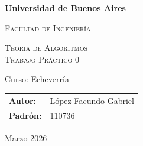 \begin{titlepage}
	\centering
	{\bfseries\LARGE Universidad de Buenos Aires \par}
	\vspace{1cm}
	{\scshape\Large Facultad de Ingeniería \par}
	\vspace{3cm}
	{\scshape\Huge Teoría de Algoritmos \\Trabajo Práctico 0\par}
	\vspace{3cm}
	{\Large Curso: Echeverría\par}
	\vfill
	{\Large
		\begin{tabular}{l l}
			\textbf{Autor:}  & López Facundo Gabriel \\
			\textbf{Padrón:} & 110736
		\end{tabular}
	}
	\vfill
	{\Large Marzo 2026 \par}
\end{titlepage}
